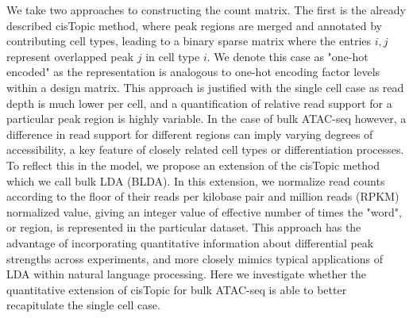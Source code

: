 We take two approaches to constructing the count matrix. The first is the already described cisTopic method, where peak regions are merged and annotated by contributing cell types, leading to a binary sparse matrix where the entries $i, j$ represent overlapped peak $j$ in cell type $i$. We denote this case as "one-hot encoded" as the representation is analogous to one-hot encoding factor levels within a design matrix. This approach is justified with the single cell case as read depth is much lower per cell, and a quantification of relative read support for a particular peak region is highly variable. In the case of bulk ATAC-seq however, a difference in read support for different regions can imply varying degrees of accessibility, a key feature of closely related cell types or differentiation processes. To reflect this in the model, we propose an extension of the cisTopic method which we call bulk LDA (BLDA). In this extension, we normalize read counts according to the floor of their reads per kilobase pair and million reads (RPKM) normalized value, giving an integer value of effective number of times the "word", or region, is represented in the particular dataset. This approach has the advantage of incorporating quantitative information about differential peak strengths across experiments, and more closely mimics typical applications of LDA within natural language processing. Here we investigate whether the quantitative extension of cisTopic for bulk ATAC-seq is able to better recapitulate the single cell case.

